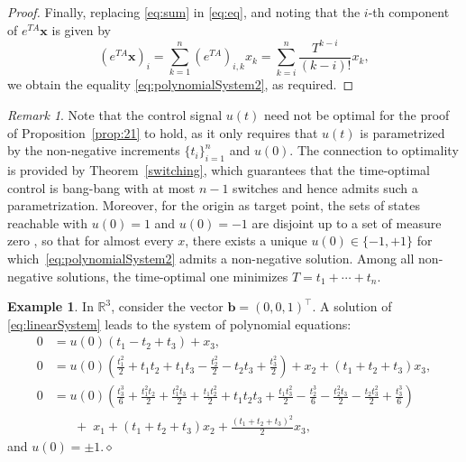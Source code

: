 \documentclass[11pt]{amsart}
\newcommand{\R}{\mathbb{R}}
\theoremstyle{definition}
\newtheorem{example}[theorem]{Example}
\theoremstyle{remark}
\newtheorem{remark}[theorem]{Remark}
\numberwithin{equation}{section}
\begin{document}
\begin{proof}
 Finally, replacing \eqref{eq:sum} in \eqref{eq:eq}, and noting that the $i$-th component of $e^{TA}\bm{x}$ is given by
 \begin{equation*}
 (e^{TA}\bm{x})_i=\sum_{k=1}^{n}(e^{TA})_{i,k}{x}_k=\sum_{k=i}^{n}\frac{T^{k-i}}{(k-i)!}{x}_k,
 \end{equation*} 
 we obtain the equality \eqref{eq:polynomialSystem2}, as required.
 \end{proof}
\begin{remark}
Note that the control signal $u(t)$ need not be optimal for the proof 
of Proposition~\ref{prop:21} to hold, as it only 
requires that $u(t)$ is parametrized by the non-negative increments 
$\{t_i\}_{i=1}^{n}$ and $u(0)$. The connection to optimality is 
provided by Theorem~\ref{switching}, which guarantees that the 
time-optimal control is bang-bang with at most $n-1$ switches and 
hence admits such a parametrization. Moreover, for the origin as 
target point, the sets of states reachable with $u(0)=1$ and $u(0)=-1$ 
are disjoint up to a set of measure zero \cite{patil}, so that for 
almost every $x$, there exists a unique $u(0)\in\{-1,+1\}$ for 
which~\eqref{eq:polynomialSystem2} admits a non-negative solution. 
Among all non-negative solutions, the time-optimal one minimizes 
$T = t_1 + \cdots + t_n$.
\end{remark}
 \begin{example}\label{ex:1}
 In $\R^3$, consider the vector $\bm{b}=(0,0,1)^\top $. A solution of \eqref{eq:linearSystem} leads to the system of polynomial equations: 
 \begin{align*}
 0&=u(0)(t_1-t_2+t_3)+x_3,\\
 0&=u(0)\left(\frac{t_1^2}{2}+t_1t_2+t_1t_3-\frac{t_2^2}{2}-t_2t_3+\frac{t_3^2}{2}\right)+x_2+(t_1+t_2+t_3)x_3,\\
 0&=u(0)\left(\frac{t_3^3}{6}+\frac{t_1^2t_2}{2}+\frac{t_1^2t_3}{2}+\frac{t_1t_2^2}{2}+t_1t_2t_3+\frac{t_1t_3^2}{2}-\frac{t_2^3}{6}-\frac{t_2^2t_3}{2}-\frac{t_2t_3^2}{2}+\frac{t_3^3}{6}\right)\\
 &\;\;\;\;\;\;+\;x_1+(t_1+t_2+t_3)x_2+\frac{(t_1+t_2+t_3)^2}{2}x_3,
 \end{align*}
 and $u(0)=\pm 1$.\hfill$\diamond$
 \end{example}
\end{document}
